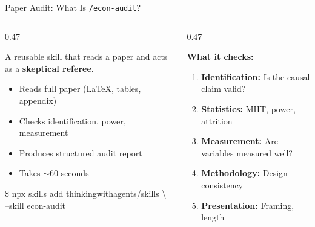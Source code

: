 \documentclass[aspectratio=169, 10pt]{beamer}
\begin{document}
\begin{frame}[fragile]{Paper Audit: What Is \texttt{/econ-audit}?}
\vskip-2pt
\begin{columns}[T]
\begin{column}{0.47\textwidth}
\begin{tcolorbox}[keybox, title={\faSearch\quad Adversarial Review Skill}, top=3pt, bottom=3pt]
\small
A reusable skill that reads a paper and acts as a \textbf{skeptical referee}.
\vskip3pt
\begin{itemize}\setlength{\itemsep}{1pt}
  \item Reads full paper (LaTeX, tables, appendix)
  \item Checks identification, power, measurement
  \item Produces structured audit report
  \item Takes $\sim$60 seconds
\end{itemize}
\end{tcolorbox}
\vskip3pt
\begin{tcolorbox}[colback=DarkSlate, colframe=DarkSlate, arc=2pt,
  left=4pt, right=4pt, top=2pt, bottom=2pt]
{\color{CoolGray}\ttfamily\scriptsize \$ npx skills add thinkingwithagents/skills \textbackslash\\
\quad\quad --skill econ-audit}
\end{tcolorbox}
\end{column}
\begin{column}{0.47\textwidth}
\begin{tcolorbox}[accentbox, top=3pt, bottom=3pt]
\small
\textbf{What it checks:}
\vskip3pt
\begin{enumerate}\setlength{\itemsep}{1pt}
  \item \textbf{Identification:} Is the causal claim valid?
  \item \textbf{Statistics:} MHT, power, attrition
  \item \textbf{Measurement:} Are variables measured well?
  \item \textbf{Methodology:} Design consistency
  \item \textbf{Presentation:} Framing, length
\end{enumerate}
\end{tcolorbox}
\end{column}
\end{columns}
\end{frame}
\end{document}
